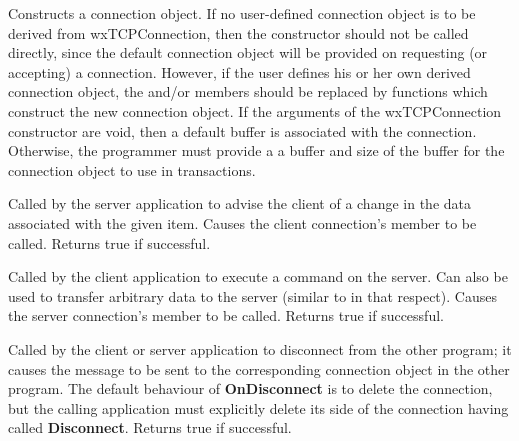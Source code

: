 



Constructs a connection object. If no user-defined connection object is
to be derived from wxTCPConnection, then the constructor should not be
called directly, since the default connection object will be provided on
requesting (or accepting) a connection. However, if the user defines his
or her own derived connection object, the \rtfsp
and/or  members should be replaced by
functions which construct the new connection object. If the arguments of
the wxTCPConnection constructor are void, then a default buffer is
associated with the connection. Otherwise, the programmer must provide a
a buffer and size of the buffer for the connection object to use in
transactions.



Called by the server application to advise the client of a change in
the data associated with the given item. Causes the client
connection's  
member to be called. Returns true if successful.



Called by the client application to execute a command on the server. Can
also be used to transfer arbitrary data to the server (similar
to  in that respect). Causes the
server connection's  member to be
called. Returns true if successful.



Called by the client or server application to disconnect from the other
program; it causes the  message
to be sent to the corresponding connection object in the other
program. The default behaviour of {\bf OnDisconnect} is to delete the
connection, but the calling application must explicitly delete its
side of the connection having called {\bf Disconnect}. Returns true if
successful.

